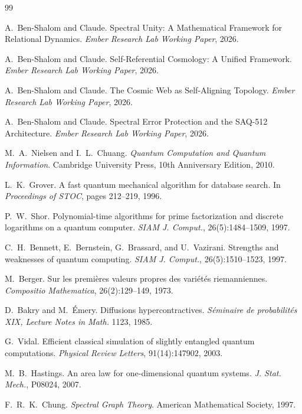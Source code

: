 \documentclass[11pt,a4paper]{article}
\theoremstyle{plain}
\theoremstyle{definition}
\theoremstyle{remark}
\begin{document}
\begin{thebibliography}{99}

A.~Ben-Shalom and Claude. Spectral Unity: A Mathematical Framework for Relational Dynamics. \emph{Ember Research Lab Working Paper}, 2026.

A.~Ben-Shalom and Claude. Self-Referential Cosmology: A Unified Framework. \emph{Ember Research Lab Working Paper}, 2026.

A.~Ben-Shalom and Claude. The Cosmic Web as Self-Aligning Topology. \emph{Ember Research Lab Working Paper}, 2026.

A.~Ben-Shalom and Claude. Spectral Error Protection and the SAQ-512 Architecture. \emph{Ember Research Lab Working Paper}, 2026.

M.~A.~Nielsen and I.~L.~Chuang. \emph{Quantum Computation and Quantum Information}. Cambridge University Press, 10th Anniversary Edition, 2010.

L.~K.~Grover. A fast quantum mechanical algorithm for database search. In \emph{Proceedings of STOC}, pages 212--219, 1996.

P.~W.~Shor. Polynomial-time algorithms for prime factorization and discrete logarithms on a quantum computer. \emph{SIAM J. Comput.}, 26(5):1484--1509, 1997.

C.~H.~Bennett, E.~Bernstein, G.~Brassard, and U.~Vazirani. Strengths and weaknesses of quantum computing. \emph{SIAM J. Comput.}, 26(5):1510--1523, 1997.

M.~Berger. Sur les premi\`eres valeurs propres des vari\'et\'es riemanniennes. \emph{Compositio Mathematica}, 26(2):129--149, 1973.

D.~Bakry and M.~\'Emery. Diffusions hypercontractives. \emph{S\'eminaire de probabilit\'es XIX, Lecture Notes in Math.} 1123, 1985.

G.~Vidal. Efficient classical simulation of slightly entangled quantum computations. \emph{Physical Review Letters}, 91(14):147902, 2003.

M.~B.~Hastings. An area law for one-dimensional quantum systems. \emph{J. Stat. Mech.}, P08024, 2007.

F.~R.~K.~Chung. \emph{Spectral Graph Theory}. American Mathematical Society, 1997.

\end{thebibliography}
\end{document}
